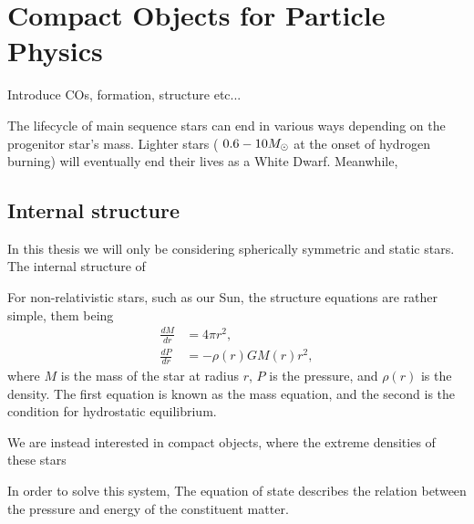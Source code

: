 \graphicspath{{img/chapter_2/}}



\chapter{Compact Objects for Particle Physics}
\label{chapter:compactobjects}

\begin{synopsis}
Introduce COs, formation, structure etc...  
\end{synopsis}



The lifecycle of main sequence stars can end in various ways
depending on the progenitor star's mass. Lighter stars ($~0.6 - 10 M_\odot$ at  
the onset of hydrogen burning) will eventually end their lives as a 
White Dwarf. Meanwhile, 



\section{Internal structure}

In this thesis we will only be considering spherically symmetric and static stars. 
The internal structure of 

For non-relativistic stars, such as our Sun, the structure equations are
rather simple, them being
\begin{align}
\frac{d M}{dr}  &= 4 \pi r^2,\\
\frac{d P }{dr} &= -\rho(r) G M(r) r^2,
\end{align}
where $M$ is the mass of the star at radius $r$, $P$ is the pressure,
and $\rho(r)$ is the density.
The first equation is known as the mass equation, and the second is the
condition for hydrostatic equilibrium. 

We are instead interested in compact objects, where the extreme densities 
of these stars 

In order to solve this system, 
The equation of state describes the relation between the pressure 
and energy of the constituent matter.


